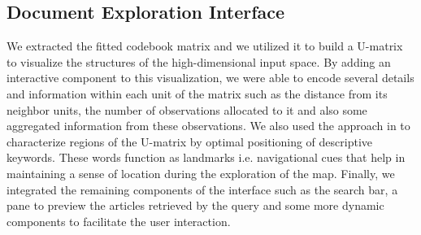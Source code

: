 \documentclass[a4paper]{article}
\begin{document}
\subsection*{Document Exploration Interface}
We extracted the fitted codebook matrix and we utilized it to build a U-matrix \citep{Ultsch1993} to visualize the structures of the high-dimensional input space. By adding an interactive component to this visualization, we were able to encode several details and information within each unit of the matrix such as the distance from its neighbor units, the number of observations allocated to it and also some aggregated information from these observations. We also used the approach in \citet{Lagus1999} to characterize regions of the U-matrix by optimal positioning of descriptive keywords. These words function as landmarks i.e. navigational cues that help in maintaining a sense of location during the exploration of the map. Finally, we integrated the remaining components of the interface such as the search bar, a pane to preview the articles retrieved by the query and some more dynamic components to facilitate the user interaction.



\end{document}
